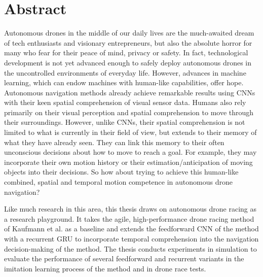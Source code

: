 \chapter*{Abstract}
Autonomous drones in the middle of our daily lives are 
the much-awaited dream of tech enthusiasts and visionary entrepreneurs, 
but also the absolute horror for many who fear for their peace of mind, privacy or safety. 
In fact, technological development is not yet advanced enough to safely deploy autonomous 
drones in the uncontrolled environments of everyday life. 
However, advances in machine learning, which can endow machines with 
human-like capabilities, offer hope. 
Autonomous navigation methods already achieve 
remarkable results using CNNs with their keen spatial comprehension 
of visual sensor data. 
Humans also rely primarily on their visual perception and spatial comprehension to move through their surroundings. 
However, unlike CNNs, their spatial comprehension 
is not limited to what is currently in their field of view, 
but extends to their memory of what they have already seen. 
They can link this memory to their often unconscious decisions 
about how to move to reach a goal. 
For example, they may incorporate their own motion history 
or their estimation/anticipation of moving objects into their decisions.
So how about trying to achieve this human-like combined, 
spatial and temporal motion competence in autonomous drone navigation?

Like much research in this area, 
this thesis draws on autonomous drone racing as a research playground. 
It takes the agile, high-performance drone racing method of Kaufmann et al. \cite{Kaufmann2018}
as a baseline and extends the feedforward CNN of the method
with a recurrent GRU to incorporate temporal comprehension 
into the navigation decision-making of the method. 
The thesis conducts experiments in simulation 
to evaluate the performance of several feedforward and recurrent variants 
in the imitation learning process of the method and in drone race tests.

